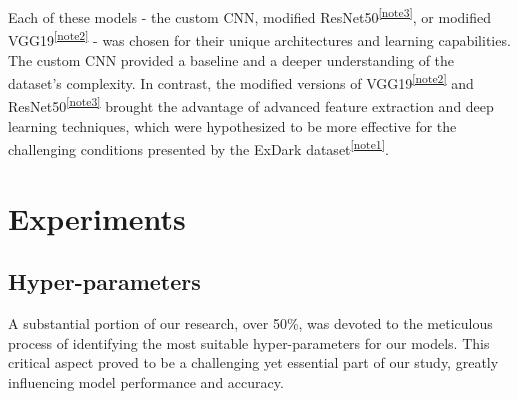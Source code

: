 \documentclass{article} %
\begin{document}
Each of these models - the custom CNN, modified ResNet50\textsuperscript{\ref{note3}}, or modified VGG19\textsuperscript{\ref{note2}} - was chosen for their unique architectures and learning capabilities. The custom CNN provided a baseline and a deeper understanding of the dataset's complexity. In contrast, the modified versions of VGG19\textsuperscript{\ref{note2}} and ResNet50\textsuperscript{\ref{note3}} brought the advantage of advanced feature extraction and deep learning techniques, which were hypothesized to be more effective for the challenging conditions presented by the ExDark dataset\textsuperscript{\ref{note1}}.

\section{Experiments}
\subsection{Hyper-parameters}
A substantial portion of our research, over 50\%, was devoted to the meticulous process of identifying the most suitable hyper-parameters for our models. This critical aspect proved to be a challenging yet essential part of our study, greatly influencing model performance and accuracy.
\end{document}
